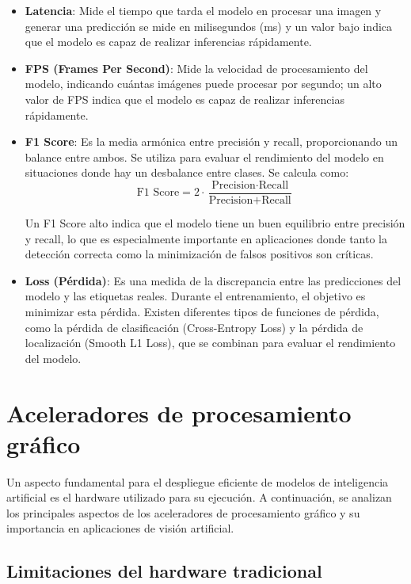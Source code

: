 \documentclass[11pt,spanish,listoffigures,listoftables]{tfgetsinf}
\begin{document}
\begin{itemize}
   \item \textbf{Latencia}: Mide el tiempo que tarda el modelo en procesar una imagen y generar una predicción se mide en milisegundos (ms) y un valor bajo indica que el modelo es capaz de realizar inferencias rápidamente.
   
   \item \textbf{FPS (Frames Per Second)}: Mide la velocidad de procesamiento del modelo, indicando cuántas imágenes puede procesar por segundo; un alto valor de FPS indica que el modelo es capaz de realizar inferencias rápidamente.
   \item \textbf{F1 Score}: Es la media armónica entre precisión y recall, proporcionando un balance entre ambos. Se utiliza para evaluar el rendimiento del modelo en situaciones donde hay un desbalance entre clases. Se calcula como:
   \[
   \text{F1 Score} = 2 \cdot \frac{\text{Precision} \cdot \text{Recall}}{\text{Precision} + \text{Recall}}
   \]

   Un F1 Score alto indica que el modelo tiene un buen equilibrio entre precisión y recall, lo que es especialmente importante en aplicaciones donde tanto la detección correcta como la minimización de falsos positivos son críticas.

   \item \textbf{Loss (Pérdida)}: Es una medida de la discrepancia entre las predicciones del modelo y las etiquetas reales. Durante el entrenamiento, el objetivo es minimizar esta pérdida. Existen diferentes tipos de funciones de pérdida, como la pérdida de clasificación (Cross-Entropy Loss) y la pérdida de localización (Smooth L1 Loss), que se combinan para evaluar el rendimiento del modelo.

\end{itemize}


\section{Aceleradores de procesamiento gráfico} \label{sec:hardware}
Un aspecto fundamental para el despliegue eficiente de modelos de inteligencia artificial es el hardware utilizado para su ejecución. A continuación, se analizan los principales aspectos de los aceleradores de procesamiento gráfico y su importancia en aplicaciones de visión artificial.

\subsection{Limitaciones del hardware tradicional} \label{sec:limitaciones_hardware}
\end{document}
